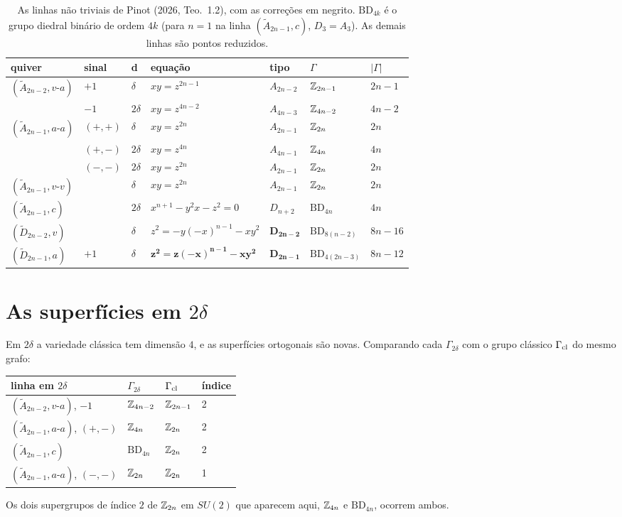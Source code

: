 \documentclass[11pt]{article}
\theoremstyle{definition}
\theoremstyle{remark}
\newcommand{\BD}{\mathrm{BD}}
\begin{document}
\begin{table}[h]\centering\small
\begin{tabular}{@{}lllllll@{}}
\toprule
quiver & sinal & d & equação & tipo & $\Gamma$ & $|\Gamma|$\\\midrule
$(\widetilde A_{2n-2},v\text{-}a)$ & $+1$ & $\delta$ & $xy=z^{2n-1}$ & $A_{2n-2}$ & $\mathbb{Z}_{2n-1}$ & $2n-1$\\
 & $-1$ & $2\delta$ & $xy=z^{4n-2}$ & $A_{4n-3}$ & $\mathbb{Z}_{4n-2}$ & $4n-2$\\
$(\widetilde A_{2n-1},a\text{-}a)$ & $(+,+)$ & $\delta$ & $xy=z^{2n}$ & $A_{2n-1}$ & $\mathbb{Z}_{2n}$ & $2n$\\
 & $(+,-)$ & $2\delta$ & $xy=z^{4n}$ & $A_{4n-1}$ & $\mathbb{Z}_{4n}$ & $4n$\\
 & $(-,-)$ & $2\delta$ & $xy=z^{2n}$ & $A_{2n-1}$ & $\mathbb{Z}_{2n}$ & $2n$\\
$(\widetilde A_{2n-1},v\text{-}v)$ & & $\delta$ & $xy=z^{2n}$ & $A_{2n-1}$ & $\mathbb{Z}_{2n}$ & $2n$\\
$(\widetilde A_{2n-1},c)$ & & $2\delta$ & $x^{n+1}-y^2x-z^2=0$ & $D_{n+2}$ & $\BD_{4n}$ & $4n$\\
$(\widetilde D_{2n-2},v)$ & & $\delta$ & $z^2=-y(-x)^{n-1}-xy^2$ & $\mathbf{D_{2n-2}}$ & $\BD_{8(n-2)}$ & $8n-16$\\
$(\widetilde D_{2n-1},a)$ & $+1$ & $\delta$ & $\mathbf{z^2=z(-x)^{n-1}-xy^2}$ & $\mathbf{D_{2n-1}}$ & $\BD_{4(2n-3)}$ & $8n-12$\\\bottomrule
\end{tabular}
\caption{As linhas não triviais de Pinot (2026, Teo.~1.2), com as correções em negrito. $\BD_{4k}$ é o grupo diedral binário de ordem $4k$ (para $n=1$ na linha $(\widetilde A_{2n-1},c)$, $D_3=A_3$). As demais linhas são pontos reduzidos.}\label{tab:main}
\end{table}

\section{As superfícies em $2\delta$}\label{sec:2delta}
Em $2\delta$ a variedade clássica tem dimensão $4$, e as superfícies ortogonais são novas. Comparando cada $\Gamma_{2\delta}$ com o grupo clássico $\Gamma_{\rm cl}$ do mesmo grafo:
\begin{center}\small
\begin{tabular}{@{}llll@{}}\toprule
linha em $2\delta$ & $\Gamma_{2\delta}$ & $\Gamma_{\rm cl}$ & índice\\\midrule
$(\widetilde A_{2n-2},v\text{-}a)$, $-1$ & $\mathbb{Z}_{4n-2}$ & $\mathbb{Z}_{2n-1}$ & 2\\
$(\widetilde A_{2n-1},a\text{-}a)$, $(+,-)$ & $\mathbb{Z}_{4n}$ & $\mathbb{Z}_{2n}$ & 2\\
$(\widetilde A_{2n-1},c)$ & $\BD_{4n}$ & $\mathbb{Z}_{2n}$ & 2\\
$(\widetilde A_{2n-1},a\text{-}a)$, $(-,-)$ & $\mathbb{Z}_{2n}$ & $\mathbb{Z}_{2n}$ & 1\\\bottomrule
\end{tabular}
\end{center}
Os dois supergrupos de índice $2$ de $\mathbb{Z}_{2n}$ em $SU(2)$ que aparecem aqui, $\mathbb{Z}_{4n}$ e $\BD_{4n}$, ocorrem ambos.
\end{document}
